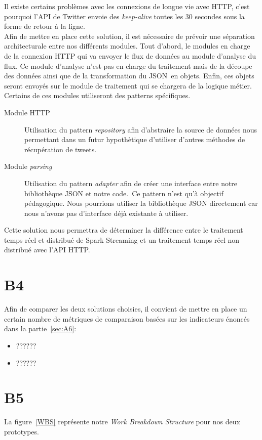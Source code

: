   Il existe certains problèmes avec les connexions de longue vie avec HTTP, c'est pourquoi l'API de Twitter envoie des \textit{keep-alive} toutes les 30 secondes sous la forme de retour à la ligne.\\

  Afin de mettre en place cette solution, il est nécessaire de prévoir une séparation architecturale entre nos différents modules. Tout d'abord, le modules en charge de la connexion HTTP qui va envoyer le flux de données au module d'analyse du flux. Ce module d'analyse n'est pas en charge du traitement mais de la découpe des données ainsi que de la transformation du JSON en objets. Enfin, ces objets seront envoyés sur le module de traitement qui se chargera de la logique métier.\\

  Certains de ces modules utiliseront des patterns spécifiques.
  \begin{description}
    \item[Module HTTP] Utilisation du pattern \textit{repository} afin d'abstraire la source de données nous permettant dans un futur hypothètique d'utiliser d'autres méthodes de récupération de tweets.
    \item[Module \textit{parsing}] Utilisation du pattern \textit{adapter} afin de créer une interface entre notre bibliothèque JSON et notre code. Ce pattern n'est qu'à objectif pédagogique. Nous pourrions utiliser la bibliothèque JSON directement car nous n'avons pas d'interface déjà existante à utiliser.
  \end{description}

  Cette solution nous permettra de déterminer la différence entre le traitement temps réel et distribué de Spark Streaming et un traitement temps réel non distribué avec l'API HTTP.


\section{B4}
\label{sec:B4}
  Afin de comparer les deux solutions choisies, il convient de mettre en place un certain nombre de métriques de comparaison basées sur les indicateurs énoncés dans la partie~\ref{sec:A6}:

  \begin{itemize}
    \item ??????
    \item ??????
  \end{itemize}


\section{B5}
\label{sec:B5}
  La figure~\ref{WBS} représente notre \emph{Work Breakdown Structure} pour nos deux prototypes.

